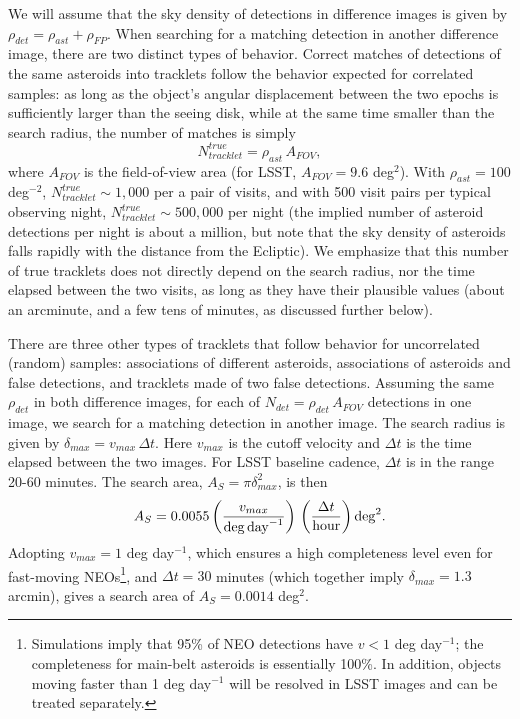 \documentclass[12pt,preprint]{aastex}
\begin{document}
We will assume that the sky density of detections in difference images is given by 
$\rho_{det} = \rho_{ast} + \rho_{FP}$. When searching for a matching detection in another
difference image, there are two distinct types of behavior. Correct matches of detections
of the same asteroids into tracklets follow the behavior expected for correlated samples:
as long as the object's angular displacement between the two epochs is sufficiently larger 
than the seeing disk, while at the same time smaller than the search radius, the number
of matches is simply 
\begin{equation}
             N_{tracklet}^{true} = \rho_{ast}  \, A_{FOV},
\end{equation}
where $A_{FOV}$ is the field-of-view area (for LSST, $A_{FOV}=9.6$ deg$^2$). With 
$\rho_{ast} = 100$ deg$^{-2}$, $N_{tracklet}^{true} \sim 1,000$ per a pair of visits, and with
500 visit pairs per typical observing night, $N_{tracklet}^{true} \sim 500,000$ per night
(the implied number of asteroid detections per night is about a million, but note that 
the sky density of asteroids falls rapidly with the distance from the Ecliptic). We emphasize 
that this number of true tracklets does not directly depend on the search radius, nor the 
time elapsed between the two visits, as long as they have their plausible values (about an 
arcminute, and a few tens of minutes, as discussed further below). 

There are three other types of tracklets that follow behavior for uncorrelated (random) 
samples: associations of different asteroids, associations of asteroids and false detections, 
and tracklets made of two false detections. Assuming the same $\rho_{det}$ in both 
difference images, for each of $N_{det} = \rho_{det} \, A_{FOV}$ detections in one image,
we search for a matching detection in another image. The search radius is given by 
$\delta_{max} = v_{max} \, \Delta t$. Here $v_{max}$ is the  cutoff velocity and $\Delta t$ 
is the time elapsed between the two images. For LSST baseline cadence, $\Delta t$ is in 
the range 20-60 minutes. The search area, $A_S = \pi \delta_{max}^2$, is then 
\begin{equation}
     A_S = 0.0055 \left( v_{max}  \over {\rm deg \, day}^{-1} \right) \, \left(\Delta t \over {\rm hour} \right) {\rm deg}^2.
\end{equation}
Adopting $v_{max} = 1$ deg day$^{-1}$, which ensures a high completeness level even for fast-moving 
NEOs\footnote{Simulations imply that 95\% of NEO detections have $v<1$ deg day$^{-1}$; the completeness
for main-belt asteroids is essentially 100\%. In addition, objects moving faster than 1 deg day$^{-1}$ will
be resolved in LSST images and can be treated separately.}, and $\Delta t = 30$ minutes (which together 
imply $\delta_{max} = 1.3$ arcmin), gives a search area of $A_S = 0.0014$ deg$^2$. 
\end{document}
